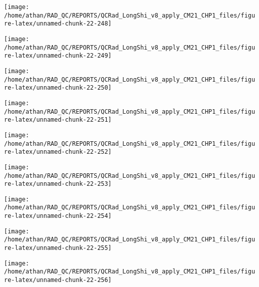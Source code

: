 \documentclass[
  10pt,
  a4paper,oneside]{article}
\begin{document}
\begin{center}\texttt{[image: /home/athan/RAD\_QC/REPORTS/QCRad\_LongShi\_v8\_apply\_CM21\_CHP1\_files/figure-latex/unnamed-chunk-22-248]} \end{center}

\begin{center}\texttt{[image: /home/athan/RAD\_QC/REPORTS/QCRad\_LongShi\_v8\_apply\_CM21\_CHP1\_files/figure-latex/unnamed-chunk-22-249]} \end{center}

\begin{center}\texttt{[image: /home/athan/RAD\_QC/REPORTS/QCRad\_LongShi\_v8\_apply\_CM21\_CHP1\_files/figure-latex/unnamed-chunk-22-250]} \end{center}

\begin{center}\texttt{[image: /home/athan/RAD\_QC/REPORTS/QCRad\_LongShi\_v8\_apply\_CM21\_CHP1\_files/figure-latex/unnamed-chunk-22-251]} \end{center}

\begin{center}\texttt{[image: /home/athan/RAD\_QC/REPORTS/QCRad\_LongShi\_v8\_apply\_CM21\_CHP1\_files/figure-latex/unnamed-chunk-22-252]} \end{center}

\begin{center}\texttt{[image: /home/athan/RAD\_QC/REPORTS/QCRad\_LongShi\_v8\_apply\_CM21\_CHP1\_files/figure-latex/unnamed-chunk-22-253]} \end{center}

\begin{center}\texttt{[image: /home/athan/RAD\_QC/REPORTS/QCRad\_LongShi\_v8\_apply\_CM21\_CHP1\_files/figure-latex/unnamed-chunk-22-254]} \end{center}

\begin{center}\texttt{[image: /home/athan/RAD\_QC/REPORTS/QCRad\_LongShi\_v8\_apply\_CM21\_CHP1\_files/figure-latex/unnamed-chunk-22-255]} \end{center}

\begin{center}\texttt{[image: /home/athan/RAD\_QC/REPORTS/QCRad\_LongShi\_v8\_apply\_CM21\_CHP1\_files/figure-latex/unnamed-chunk-22-256]} \end{center}
\end{document}
